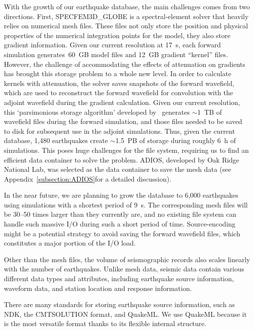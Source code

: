 With the growth of our earthquake database, the main challenges comes from two directions.
First, SPECFEM3D\_GLOBE is a spectral-element solver that heavily
relies on numerical mesh files.
These files not only store
the position and physical properties of the numerical integration points for the model,
they also store gradient information.
Given our current resolution at 17~s,
each forward simulation generates~60~GB model
files and 12~GB gradient ``kernel'' files.
However, the challenge of accommodating the effects of attenuation on gradients has brought this
storage problem to a whole new level.
In order to calculate kernels with attenuation,
the solver saves snapshots of the forward wavefield,
which are used to reconstruct the forward wavefield for convolution with the adjoint wavefield during the gradient calculation.
Given our current resolution,
this `parsimonious storage algorithm' developed by~\cite{KoXiBoPeSaLiTr16} generates $\sim$1~TB of wavefield files during the forward simulation, and those
files needed to be saved to disk for subsequent use in the adjoint simulations.
Thus, given the current database,
1,480 earthquakes create $\sim$1.5~PB of storage during roughly 6~h of simulations.
This poses huge challenges for the file system,
requiring us to find an efficient data container to solve the problem.
ADIOS, developed by Oak Ridge
National Lab, was selected as the data container to save the mesh data
(see Appendix~\ref{subsection:ADIOS}for a detailed discussion).

In the near future, we are
planning to grow the database to 6,000 earthquakes using simulations with a
shortest period of 9~s.
The corresponding mesh files will be 30--50 times larger than they currently are,
and no existing file system can handle such massive I/O during such a short period of time.
Source-encoding might be a potential strategy to avoid saving the forward
wavefield files, which constitutes a major portion of the I/O load.

Other than the mesh files,
the volume of seismographic records also scales linearly with the number
of earthquakes.
Unlike mesh data, seismic data contain various different
data types and attributes,
including earthquake source information, waveform data, and station location and response information.

There are many standards for storing earthquake source information,
such as NDK, the CMTSOLUTION format, and QuakeML.
We use QuakeML because it is the most versatile format thanks to its flexible
internal structure.

